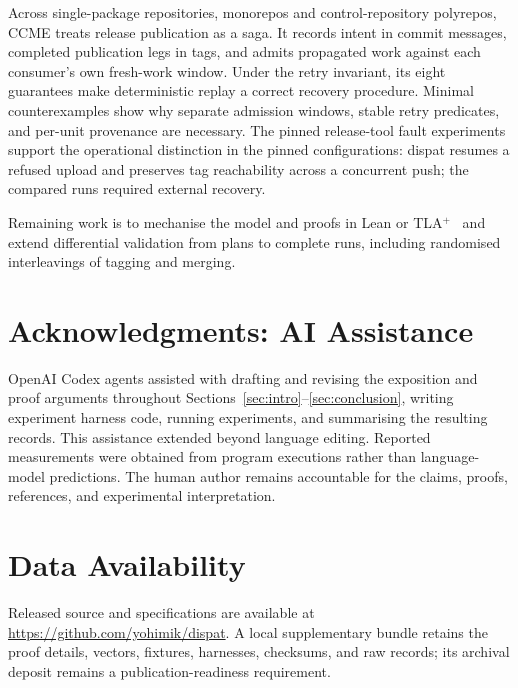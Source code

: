 \documentclass[sigconf,nonacm]{acmart}
\begin{document}
Across single-package repositories, monorepos and control-repository polyrepos,
CCME treats release publication as a saga. It records intent in commit
messages, completed publication legs in tags, and admits propagated work
against each consumer's own fresh-work window. Under the retry invariant, its eight
guarantees make deterministic replay a correct recovery procedure.
Minimal counterexamples show why separate admission windows, stable retry
predicates, and per-unit provenance are necessary. The pinned release-tool fault experiments support the operational distinction in the pinned configurations:
dispat resumes a refused upload and preserves tag reachability across a
concurrent push; the compared runs required external recovery.

Remaining work is to mechanise the model and proofs in Lean or
TLA$^{+}$~\cite{lamport} and extend differential validation from plans to
complete runs, including randomised interleavings of tagging and merging.

\section*{Acknowledgments: AI Assistance}
OpenAI Codex agents assisted with drafting and revising the exposition and
proof arguments throughout Sections~\ref{sec:intro}--\ref{sec:conclusion},
writing experiment harness code, running experiments, and summarising the
resulting records. This assistance extended beyond language editing.
Reported measurements were obtained from program executions rather than
language-model predictions. The human author remains accountable for the
claims, proofs, references, and experimental interpretation.

\section*{Data Availability}

Released source and specifications are available at
\url{https://github.com/yohimik/dispat}. A local supplementary bundle retains
the proof details, vectors, fixtures, harnesses, checksums, and raw records;
its archival deposit remains a publication-readiness requirement.
\end{document}
